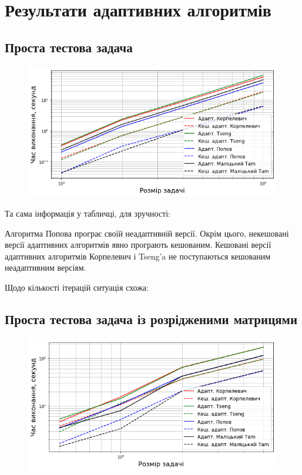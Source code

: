 \chapter{Результати адаптивних алгоритмів}

\section{Проста тестова задача}

\begin{figure}[H]
    \centering
    \includegraphics[width=.75\textwidth]{img/1/adapt/time.png}
\end{figure}

Та сама інформація у табличці, для зручності:



Алгоритма Попова програє своїй неадаптивній версії. Окрім цього, некешовані версії адаптивних алгоритмів явно програють кешованим. Кешовані версії адаптивних алгоритмів Корпелевич і Tseng'a не поступаються кешованим неадаптивним версіям. \medskip

Щодо кількості ітерацій ситуація схожа:



\section{Проста тестова задача із розрідженими матрицями}

\begin{figure}[H]
    \centering
    \includegraphics[width=.75\textwidth]{img/1/sparse/adapt/time.png}
\end{figure}

